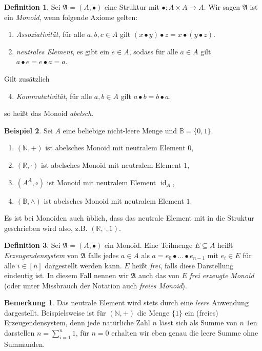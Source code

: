 \documentclass[11pt, a4paper]{article}
\theoremstyle{definition}
\newtheorem{definition}{Definition}[section]
\newtheorem{example}[definition]{Beispiel}
\newtheorem*{remark*}{Bemerkung}
\theoremstyle{plain}
\numberwithin{equation}{section}
\DeclareMathOperator{\id}{id}
\begin{document}
\begin{definition}
	Sei $\mathfrak{A} = (A, \bullet)$ eine Struktur mit $\bullet\colon A \times A \to A$. Wir sagen $\mathfrak{A}$ ist ein \textit{Monoid}, wenn folgende Axiome gelten:
	\begin{enumerate}
		\item \textit{Assoziativität}, für alle $a, b, c \in A$ gilt $(x \bullet y) \bullet z = x \bullet (y \bullet z)$.
		\item \textit{neutrales Element}, es gibt ein $e \in A$, sodass für alle $a \in A$ gilt $a \bullet e = e \bullet a = a$.
	\end{enumerate}
	Gilt zusätzlich
	\begin{enumerate}\setcounter{enumi}{3}
		\item \textit{Kommutativität}, für alle $a, b \in A$ gilt $a \bullet b = b \bullet a$.
	\end{enumerate}
	so heißt das Monoid \textit{abelsch}.
\end{definition}
\begin{example}
	Sei $A$ eine beliebige nicht-leere Menge und $\mathbb{B} = \{ 0, 1 \}$.
	\begin{enumerate}
		\item $(\mathbb{N}, +)$ ist abelsches Monoid mit neutralem Element $0$,
		\item $(\mathbb{R}, \cdot)$ ist abelsches Monoid mit neutralem Element $1$,
		\item $(A^A, \circ)$ ist Monoid mit neutralem Element $\id_A$,
		\item $(\mathbb{B}, \wedge)$ ist abelsches Monoid mit neutralem Element $1$.
	\end{enumerate}
\end{example}
Es ist bei Monoiden auch üblich, dass das neutrale Element mit in die Struktur geschrieben wird also, z.B. $(\mathbb{R}, \cdot, 1)$.
\begin{definition}
	Sei $\mathfrak{A} = (A, \bullet)$ ein Monoid. Eine Teilmenge $E \subseteq A$ heißt \textit{Erzeugendensystem} von $\mathfrak{A}$ falls jedes $a \in A$ als $a = e_0 \bullet \ldots \bullet e_{n-1}$ mit $e_i \in E$ für alle $i \in [n]$ dargestellt werden kann. $E$ heißt \textit{frei}, falls diese Darstellung eindeutig ist. In diesem Fall nennen wir $\mathfrak{A}$ auch das von $E$ \textit{frei erzeugte Monoid} (oder unter Missbrauch der Notation auch \textit{freies Monoid}).
\end{definition}
\begin{remark*}
	Das neutrale Element wird stets durch eine \textit{leere} Anwendung dargestellt. Beispielsweise ist für $(\mathbb{N}, +)$ die Menge $\{1\}$ ein (freies) Erzeugendensystem, denn jede natürliche Zahl $n$ lässt sich als Summe von $n$ $1$en darstellen $n = \sum_{i=1}^n 1$, für $n = 0$ erhalten wir eben genau die leere Summe ohne Summanden.
\end{remark*}
\end{document}
